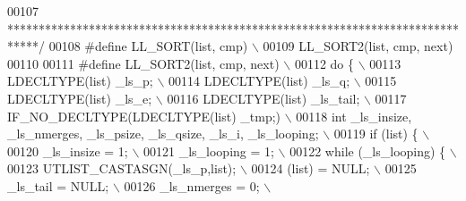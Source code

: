 \begin{DoxyCode}
00107 \textcolor{comment}{ *****************************************************************************/}
00108 \textcolor{preprocessor}{#define LL\_SORT(list, cmp)                                                                     \(\backslash\)}
00109 \textcolor{preprocessor}{    LL\_SORT2(list, cmp, next)}
00110 
00111 \textcolor{preprocessor}{#define LL\_SORT2(list, cmp, next)                                                              \(\backslash\)}
00112 \textcolor{preprocessor}{do \{                                                                                           \(\backslash\)}
00113 \textcolor{preprocessor}{  LDECLTYPE(list) \_ls\_p;                                                                       \(\backslash\)}
00114 \textcolor{preprocessor}{  LDECLTYPE(list) \_ls\_q;                                                                       \(\backslash\)}
00115 \textcolor{preprocessor}{  LDECLTYPE(list) \_ls\_e;                                                                       \(\backslash\)}
00116 \textcolor{preprocessor}{  LDECLTYPE(list) \_ls\_tail;                                                                    \(\backslash\)}
00117 \textcolor{preprocessor}{  IF\_NO\_DECLTYPE(LDECLTYPE(list) \_tmp;)                                                        \(\backslash\)}
00118 \textcolor{preprocessor}{  int \_ls\_insize, \_ls\_nmerges, \_ls\_psize, \_ls\_qsize, \_ls\_i, \_ls\_looping;                       \(\backslash\)}
00119 \textcolor{preprocessor}{  if (list) \{                                                                                  \(\backslash\)}
00120 \textcolor{preprocessor}{    \_ls\_insize = 1;                                                                            \(\backslash\)}
00121 \textcolor{preprocessor}{    \_ls\_looping = 1;                                                                           \(\backslash\)}
00122 \textcolor{preprocessor}{    while (\_ls\_looping) \{                                                                      \(\backslash\)}
00123 \textcolor{preprocessor}{      UTLIST\_CASTASGN(\_ls\_p,list);                                                             \(\backslash\)}
00124 \textcolor{preprocessor}{      (list) = NULL;                                                                           \(\backslash\)}
00125 \textcolor{preprocessor}{      \_ls\_tail = NULL;                                                                         \(\backslash\)}
00126 \textcolor{preprocessor}{      \_ls\_nmerges = 0;                                                                         \(\backslash\)}

\end{DoxyCode}
